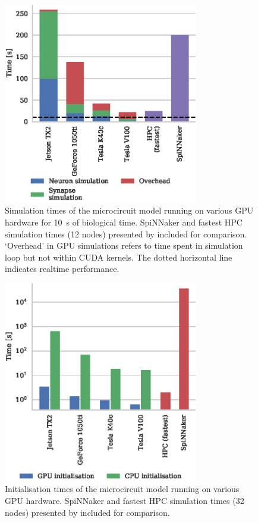 \documentclass[utf8]{frontiersSCNS} %
\begin{document}
\begin{figure}
    \begin{center}
        \includegraphics[width=85mm]{figures/microcircuit_performance}
    \end{center}
    \caption{Simulation times of the microcircuit model running on various GPU hardware for \SI{10}{\second} of biological time.
    SpiNNaker and fastest HPC simulation times (12 nodes) presented by \citet{VanAlbada2018} included for comparison.
    `Overhead' in GPU simulations refers to time spent in simulation loop but not within CUDA kernels.
    The dotted horizontal line indicates realtime performance.}
    \label{fig:microcircuit_performance}
\end{figure}

\begin{figure}
    \begin{center}
        \includegraphics[width=85mm]{figures/microcircuit_init_performance}
    \end{center}
    \caption{Initialisation times of the microcircuit model running on various GPU hardware.
    SpiNNaker and fastest HPC simulation times (32 nodes) presented by \citet{VanAlbada2018} included for comparison.}
    \label{fig:microcircuit_init_performance}
\end{figure}
\end{document}
